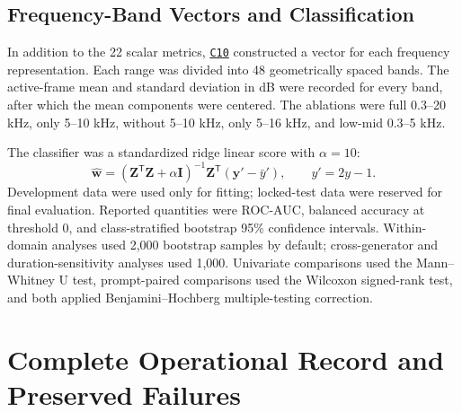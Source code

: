 \documentclass[11pt,a4paper]{article}
\newcommand{\coderef}[1]{\hyperlink{code:#1}{\texttt{#1}}}
\begin{document}
\subsection{Frequency-Band Vectors and Classification}

In addition to the 22 scalar metrics, \coderef{C10} constructed a vector for each frequency representation. Each range was divided into 48 geometrically spaced bands. The active-frame mean and standard deviation in dB were recorded for every band, after which the mean components were centered. The ablations were full 0.3--20 kHz, only 5--10 kHz, without 5--10 kHz, only 5--16 kHz, and low-mid 0.3--5 kHz.

The classifier was a standardized ridge linear score with $\alpha=10$:
\begin{equation}
\hat{\mathbf{w}}=(\mathbf{Z}^{\mathsf T}\mathbf{Z}+\alpha\mathbf{I})^{-1}
\mathbf{Z}^{\mathsf T}(\mathbf{y}'-\bar{y}'),\qquad y'=2y-1.
\label{eq:ridge}
\end{equation}
Development data were used only for fitting; locked-test data were reserved for final evaluation. Reported quantities were ROC-AUC, balanced accuracy at threshold 0, and class-stratified bootstrap 95\% confidence intervals. Within-domain analyses used 2,000 bootstrap samples by default; cross-generator and duration-sensitivity analyses used 1,000. Univariate comparisons used the Mann--Whitney U test, prompt-paired comparisons used the Wilcoxon signed-rank test, and both applied Benjamini--Hochberg multiple-testing correction.

\section{Complete Operational Record and Preserved Failures}
\label{sec:operations}
\end{document}
